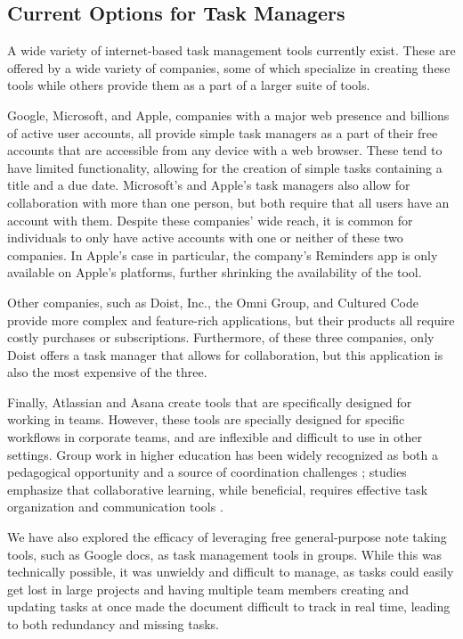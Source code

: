 \documentclass[11pt,oneside]{article}
\begin{document}
\subsection{Current Options for Task Managers}
A wide variety of internet-based task management tools currently exist. These are offered by a wide variety of companies, some of which specialize in creating these tools while others provide them as a part of a larger suite of tools.

Google, Microsoft, and Apple, companies with a major web presence and billions of active user accounts, all provide simple task managers as a part of their free accounts that are accessible from any device with a web browser. These tend to have limited functionality, allowing for the creation of simple tasks containing a title and a due date. Microsoft’s and Apple’s task managers also allow for collaboration with more than one person, but both require that all users have an account with them. Despite these companies’ wide reach, it is common for individuals to only have active accounts with one or neither of these two companies. In Apple’s case in particular, the company’s Reminders app is only available on Apple’s platforms, further shrinking the availability of the tool.


Other companies, such as Doist, Inc., the Omni Group, and Cultured Code provide more complex and feature-rich applications, but their products all require costly purchases or subscriptions. Furthermore, of these three companies, only Doist offers a task manager that allows for collaboration, but this application is also the most expensive of the three.

Finally, Atlassian and Asana create tools that are specifically designed for working in teams. However, these tools are specially designed for specific workflows in corporate teams, and are inflexible and difficult to use in other settings. Group work in higher education has been widely recognized as both a pedagogical opportunity and a source of coordination challenges \citep{johnson2009educational}; studies emphasize that collaborative learning, while beneficial, requires effective task organization and communication tools \citep{dunlosky2013improving}.

We have also explored the efficacy of leveraging free general-purpose note taking tools, such as Google docs, as task management tools in groups. While this was technically possible, it was unwieldy and difficult to manage, as tasks could easily get lost in large projects and having multiple team members creating and updating tasks at once made the document difficult to track in real time, leading to both redundancy and missing tasks.
\end{document}
